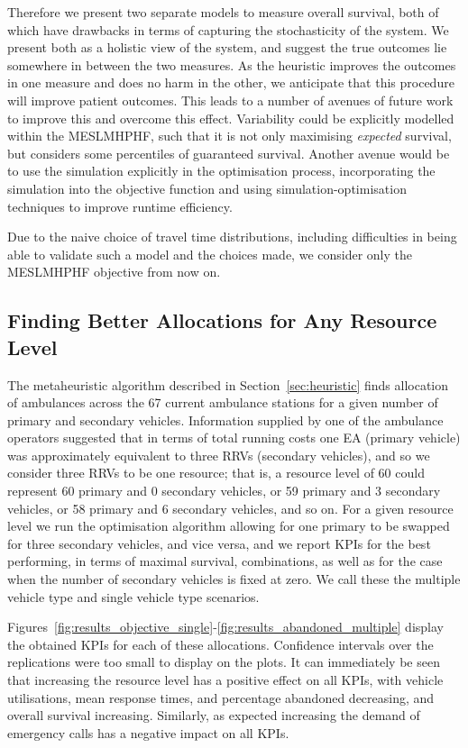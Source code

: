 \documentclass[numbers,webpdf,imaman]{ima-authoring-template}%
\begin{document}
Therefore we present two separate models to measure overall
survival, both of which have drawbacks in terms of capturing the stochasticity
of the system. We present both as a holistic view of the system, and suggest the
true outcomes lie somewhere in between the two measures. As the heuristic
improves the outcomes in one measure and does no harm in the other, we
anticipate that this procedure will improve patient outcomes.
This leads to a number of avenues of future work to improve this and overcome
this effect. Variability could be explicitly modelled within the MESLMHPHF, such
that it is not only maximising \textit{expected} survival, but considers some
percentiles of guaranteed survival. Another avenue would be to use the
simulation explicitly in the optimisation process, incorporating the simulation
into the objective function and using simulation-optimisation techniques to
improve runtime efficiency.

Due to the naive choice of travel time distributions, including difficulties in
being able to validate such a model and the choices made, we consider only the
MESLMHPHF objective from now on.


\subsection{Finding Better Allocations for Any Resource Level}\label{sec:vehicle_numbers}
The metaheuristic algorithm described in Section~\ref{sec:heuristic} finds
allocation of ambulances across the 67 current ambulance stations for a given
number of primary and secondary vehicles. Information supplied by one of the
ambulance operators suggested that in terms of total running costs one EA
(primary vehicle) was approximately equivalent to three RRVs (secondary
vehicles), and so we consider three RRVs to be one resource; that is, a
resource level of 60 could represent 60 primary and 0 secondary vehicles, or
59 primary and 3 secondary vehicles, or 58 primary and 6 secondary vehicles,
and so on. For a given resource level we run the optimisation algorithm allowing
for one primary to be swapped for three secondary vehicles, and vice versa,
and we report KPIs for the best performing, in terms of maximal
survival, combinations, as well as for the case when the number of secondary
vehicles is fixed at zero. We call these the multiple vehicle type and single
vehicle type scenarios.

Figures~\ref{fig:results_objective_single}-\ref{fig:results_abandoned_multiple}
display the obtained KPIs for each of these allocations. Confidence intervals
over the replications were too small to display on the plots. It can
immediately be seen that increasing the resource level has a positive effect on
all KPIs, with vehicle utilisations, mean response times, and percentage
abandoned decreasing, and overall survival increasing. Similarly, as expected
increasing the demand of emergency calls has a negative impact on all KPIs.
\end{document}
